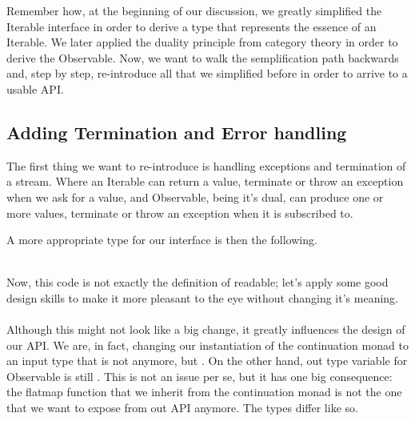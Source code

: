 Remember how, at the beginning of our discussion, we greatly simplified the Iterable interface in order to derive a type that represents the essence of an Iterable. We later applied the duality principle from category theory in order to derive the Observable. Now, we want to walk the semplification path backwards and, step by step, re-introduce all that we simplified before in order to arrive to a usable API.

\subsection{Adding Termination and Error handling}
\label{subsec:subsec01}


The first thing we want to re-introduce is handling exceptions and termination of a stream. Where an Iterable can return a value, terminate or throw an exception when we ask for a value, and Observable, being it's dual, can produce one or more values, terminate or throw an exception when it is subscribed to. 

A more appropriate type for our interface is then the following.\\

\\


Now, this code is not exactly the definition of readable; let's apply some good design skills to make it more pleasant to the eye without changing it's meaning.\\

\\

Although this might not look like a big change, it greatly influences the design of our API. We are, in fact, changing our instantiation of the continuation monad to an input type that is not  anymore, but . On the other hand, out type variable for Observable is still . This is not an issue per se, but it has one big consequence: the flatmap function that we inherit from the continuation monad is not the one that we want to expose from out API anymore. The types differ like so.\\

\\

